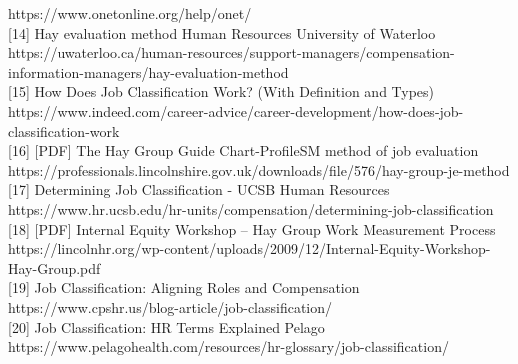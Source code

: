\documentclass[
  letterpaper,
  DIV=11,
  numbers=noendperiod]{scrartcl}
\begin{document}
https://www.onetonline.org/help/onet/\\
{[}14{]} Hay evaluation method \textbar{} Human Resources \textbar{}
University of Waterloo
https://uwaterloo.ca/human-resources/support-managers/compensation-information-managers/hay-evaluation-method\\
{[}15{]} How Does Job Classification Work? (With Definition and Types)
https://www.indeed.com/career-advice/career-development/how-does-job-classification-work\\
{[}16{]} {[}PDF{]} The Hay Group Guide Chart-ProfileSM method of job
evaluation
https://professionals.lincolnshire.gov.uk/downloads/file/576/hay-group-je-method\\
{[}17{]} Determining Job Classification - UCSB Human Resources
https://www.hr.ucsb.edu/hr-units/compensation/determining-job-classification\\
{[}18{]} {[}PDF{]} Internal Equity Workshop -- Hay Group Work
Measurement Process
https://lincolnhr.org/wp-content/uploads/2009/12/Internal-Equity-Workshop-Hay-Group.pdf\\
{[}19{]} Job Classification: Aligning Roles and Compensation
https://www.cpshr.us/blog-article/job-classification/\\
{[}20{]} Job Classification: HR Terms Explained \textbar{} Pelago
https://www.pelagohealth.com/resources/hr-glossary/job-classification/\\
\end{document}
